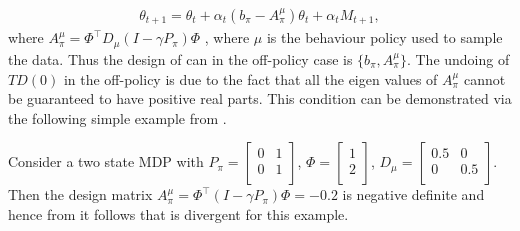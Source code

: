 \begin{align}\label{tdzerooffsa}
\theta_{t+1}=\theta_t+\alpha_t(b_\pi-A^\mu_\pi)\theta_t+\alpha_t M_{t+1},
\end{align}
where $A^{\mu}_\pi=\Phi^\top D_\mu (I-\gamma P_\pi)\Phi$ , where $\mu$ is the behaviour policy used to sample the data. Thus the design of \tdo can in the off-policy case is $\{b_\pi,A^\mu_\pi\}$.
The undoing of $TD(0)$ in the off-policy is due to the fact that all the eigen values of $A^\mu_\pi$ cannot be guaranteed to have positive real parts. This condition can be demonstrated via the following simple example from \cite{}.
\begin{example}
Consider a two state MDP with $P_\pi=
\begin{bmatrix}
    0       & 1  \\
    0       & 1 \\
\end{bmatrix}$, $\Phi=\begin{bmatrix}
 1  \\
2 \\
\end{bmatrix}$, $D_\mu=
\begin{bmatrix}
    0.5       & 0  \\
    0       &0.5 \\
\end{bmatrix}$. Then the design matrix $A^\mu_\pi=\Phi^\top(I-\gamma P_\pi)\Phi=-0.2$ is negative definite and hence from  it follows that \tdo is divergent for this example.
\end{example}
%
